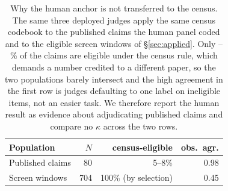 \begin{table}[t]
\centering\small
\setlength{\tabcolsep}{4pt}
\begin{tabular}{@{}lrrr@{}}
\toprule
Population & $N$ & census-eligible & obs.\ agr. \\
\midrule
Published claims & 80 & 5--8\% & 0.98 \\
Screen windows & 704 & 100\% (by selection) & 0.45 \\
\bottomrule
\end{tabular}
\caption{Why the human anchor is not transferred to the census. The same three deployed judges apply the same census codebook to the \BrgClaimN{} published claims the human panel coded and to the \CensusEligible{} eligible screen windows of \S\ref{sec:applied}. Only \BrgEligLo--\BrgEligHi\% of the claims are eligible under the census rule, which demands a number credited to a different paper, so the two populations barely intersect and the high agreement in the first row is judges defaulting to one label on ineligible items, not an easier task. We therefore report the human result as evidence about adjudicating published claims and compare no $\kappa$ across the two rows.}
\label{tab:population-bridge}
\end{table}
